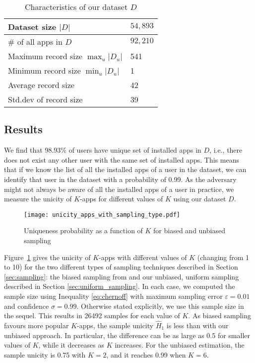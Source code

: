\documentclass{acm_proc_article-sp}
\theoremstyle{plain}
\theoremstyle{plain}
\theoremstyle{plain}
\theoremstyle{plain}
\theoremstyle{plain}
\theoremstyle{plain}
\begin{document}
\begin{table}
\centering
\begin{tabular}{|l|l|}
\hline
Dataset size $|D|$ & $54,893$ \\ \hline 
\# of all apps in $D$ & $92,210$ \\ \hline
Maximum record size $\max_u|D_u|$ & 541\\ \hline
Minimum record size $\min_u|D_u|$ & 1 \\ \hline
Average record size & 42 \\ \hline
Std.dev of record size & 39 \\ \hline
\end{tabular}
\caption{\label{tab:D} Characteristics of our dataset $D$}
\end{table}



\subsection{Results}

We find that 98.93\% of users have unique set of installed apps in $D$, i.e., there does not exist any other user with the same set of installed apps.
This means that if we know the list of all the installed apps of a user in the dataset, we can identify that user in the dataset with a probability of 0.99.
As the adversary might not always be aware of all the installed apps of a user in practice, we measure the unicity of $K$-apps for different values of $K$ using our dataset $D$. 





 \begin{figure}[h]
 	\texttt{[image: unicity\_apps\_with\_sampling\_type.pdf]}
 	\caption{Uniqueness probability as a function of $K$ for biased and unbiased sampling}
 	\label{fig:unicity_with_sampling_type}
 \end{figure}

Figure~\ref{fig:unicity_with_sampling_type} gives the unicity of $K$-apps with different values of $K$ (changing from 1 to 10) for the two different types of sampling techniques described in Section \ref{sec:sampling}: the biased sampling from \cite{Nature13, Science15} and our unbiased, uniform sampling described in Section \ref{sec:uniform_sampling}.
In each case, we computed the sample size using Inequality \ref{eq:chernoff} with maximum sampling error $\varepsilon = 0.01$ and confidence  $\sigma=0.99$.  Otherwise stated explicitly, we use this sample size in the sequel. This results in 26492 samples for each value of $K$. As biased sampling favours more popular $K$-apps, the sample unicity $\hat{H}_1$ is less than with our unbiased approach. In particular, the difference can be as large as 0.5 for smaller values of $K$, while it decreases as $K$ increases.
For the unbiased estimation, the sample unicity is 0.75 with $K=2$, and it reaches 0.99 when $K=6$.
\end{document}
